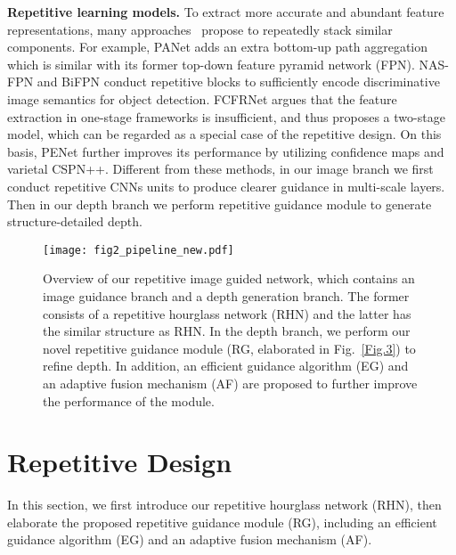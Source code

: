 \documentclass[runningheads]{llncs}
\begin{document}
\noindent \textbf{Repetitive learning models.} To extract more accurate and abundant feature representations, many approaches~\cite{ren2015faster,cai2018cascade,liu2020cbnet,qiao2021detectors} propose to repeatedly stack similar components. For example, PANet \cite{liu2018path} adds an extra bottom-up path aggregation which is similar with its former top-down feature pyramid network (FPN). NAS-FPN \cite{ghiasi2019fpn} and BiFPN \cite{tan2020efficientdet} conduct repetitive blocks to sufficiently encode discriminative image semantics for object detection. FCFRNet \cite{liu2021fcfr} argues that the feature extraction in one-stage frameworks is insufficient, and thus proposes a two-stage model, 
which can be regarded as a special case of the repetitive design. On this basis, PENet \cite{hu2020PENet} further improves its performance by utilizing confidence maps and varietal CSPN++.
Different from these methods, in our image branch we first conduct repetitive CNNs units to produce clearer guidance in multi-scale layers. Then in our depth branch we perform repetitive guidance module to generate structure-detailed depth.

\begin{figure}[t]
  \centering
  \texttt{[image: fig2\_pipeline\_new.pdf]}\\
  \caption{Overview of our repetitive image guided network, which contains an image guidance branch and a depth generation branch. The former consists of a repetitive hourglass network (RHN) and the latter has the similar structure as RHN. In the depth branch, we perform our novel repetitive guidance module (RG, elaborated in Fig.~\ref{Fig.3}) to refine depth. In addition, an efficient guidance algorithm (EG) and an adaptive fusion mechanism (AF) are proposed to further improve the performance of the module.}\label{Fig.2}
\end{figure}



\section{Repetitive Design}
In this section, we first introduce our repetitive hourglass network (RHN), then elaborate the proposed repetitive guidance module (RG), including an efficient guidance algorithm (EG) and an adaptive fusion mechanism (AF).
\end{document}
